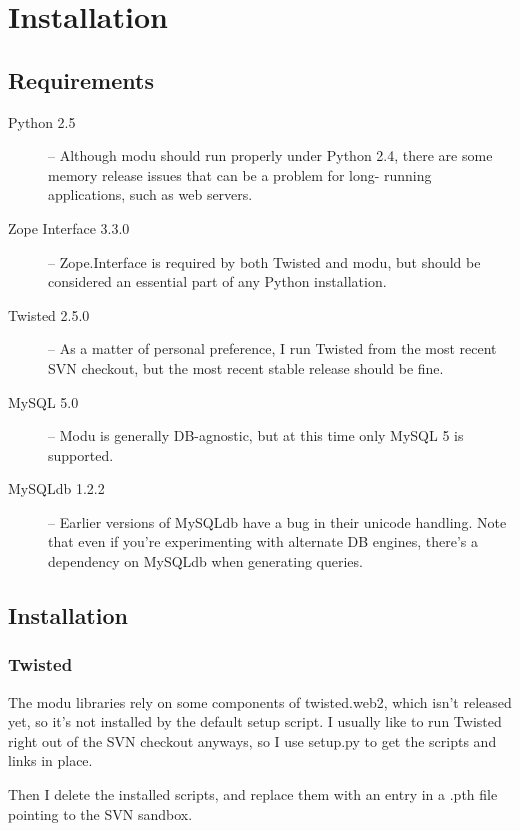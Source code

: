 \chapter{Installation}

\section{Requirements}

\begin{flushleft}
\begin{description}
    \item[Python 2.5] -- Although modu should run properly under Python 2.4,
        there are some memory release issues that can be a problem for long-
        running applications, such as web servers.
    \item[Zope Interface 3.3.0] -- Zope.Interface is required by both Twisted
        and modu, but should be considered an essential part of any Python
        installation.
    \item[Twisted 2.5.0] -- As a matter of personal preference, I run Twisted
        from the most recent SVN checkout, but the most recent stable release
        should be fine.
    \item[MySQL 5.0] -- Modu is generally DB-agnostic, but at this time only
        MySQL 5 is supported.
    \item[MySQLdb 1.2.2] -- Earlier versions of MySQLdb have a bug in their
        unicode handling. Note that even if you're experimenting with alternate
        DB engines, there's a dependency on MySQLdb when generating queries.
\end{description}
\end{flushleft}

\section{Installation}
\subsection{Twisted}

The modu libraries rely on some components of twisted.web2, which
isn't released yet, so it's not installed by the default setup script.
I usually like to run Twisted right out of the SVN checkout anyways,
so I use setup.py to get the scripts and links in place.

Then I delete the installed scripts, and replace them with an entry
in a .pth file pointing to the SVN sandbox.

